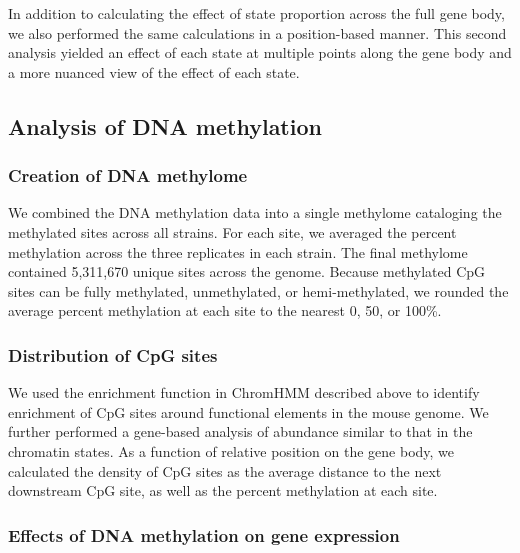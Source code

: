 \documentclass[
  11pt,
]{article}
\begin{document}
In addition to calculating the effect of state proportion across the
full gene body, we also performed the same calculations in a
position-based manner. This second analysis yielded an effect of each
state at multiple points along the gene body and a more nuanced view of
the effect of each state.

\hypertarget{analysis-of-dna-methylation}{%
\subsection{Analysis of DNA
methylation}\label{analysis-of-dna-methylation}}

\hypertarget{creation-of-dna-methylome}{%
\subsubsection{Creation of DNA
methylome}\label{creation-of-dna-methylome}}

We combined the DNA methylation data into a single methylome cataloging
the methylated sites across all strains. For each site, we averaged the
percent methylation across the three replicates in each strain. The
final methylome contained 5,311,670 unique sites across the genome.
Because methylated CpG sites can be fully methylated, unmethylated, or
hemi-methylated, we rounded the average percent methylation at each site
to the nearest 0, 50, or 100\%.

\hypertarget{distribution-of-cpg-sites}{%
\subsubsection{Distribution of CpG
sites}\label{distribution-of-cpg-sites}}

We used the enrichment function in ChromHMM described above to identify
enrichment of CpG sites around functional elements in the mouse genome.
We further performed a gene-based analysis of abundance similar to that
in the chromatin states. As a function of relative position on the gene
body, we calculated the density of CpG sites as the average distance to
the next downstream CpG site, as well as the percent methylation at each
site.

\hypertarget{effects-of-dna-methylation-on-gene-expression}{%
\subsubsection{Effects of DNA methylation on gene
expression}\label{effects-of-dna-methylation-on-gene-expression}}
\end{document}
